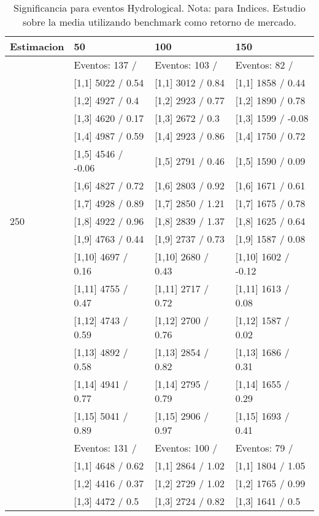 \begin{table}

\caption{Significancia para eventos Hydrological. Nota: para Indices. Estudio sobre la media utilizando benchmark como retorno de mercado.}
\centering
\begin{tabular}[t]{llll}
\toprule
Estimacion & 50 & 100 & 150\\
\midrule
 & Eventos:  137 / & Eventos:  103 / & Eventos:  82 /\\
 & {}[1,1] 5022  / 0.54 & {}[1,1] 3012  / 0.84 & {}[1,1] 1858  / 0.44\\
 & {}[1,2] 4927  / 0.4 & {}[1,2] 2923  / 0.77 & {}[1,2] 1890  / 0.78\\
 & {}[1,3] 4620  / 0.17 & {}[1,3] 2672  / 0.3 & {}[1,3] 1599  / -0.08\\
 & {}[1,4] 4987  / 0.59 & {}[1,4] 2923  / 0.86 & {}[1,4] 1750  / 0.72\\
\addlinespace
 & {}[1,5] 4546  / -0.06 & {}[1,5] 2791  / 0.46 & {}[1,5] 1590  / 0.09\\
 & {}[1,6] 4827  / 0.72 & {}[1,6] 2803  / 0.92 & {}[1,6] 1671  / 0.61\\
 & {}[1,7] 4928  / 0.89 & {}[1,7] 2850  / 1.21 & {}[1,7] 1675  / 0.78\\
250 & {}[1,8] 4922  / 0.96 & {}[1,8] 2839  / 1.37 & {}[1,8] 1625  / 0.64\\
 & {}[1,9] 4763  / 0.44 & {}[1,9] 2737  / 0.73 & {}[1,9] 1587  / 0.08\\
\addlinespace
 & {}[1,10] 4697  / 0.16 & {}[1,10] 2680  / 0.43 & {}[1,10] 1602  / -0.12\\
 & {}[1,11] 4755  / 0.47 & {}[1,11] 2717  / 0.72 & {}[1,11] 1613  / 0.08\\
 & {}[1,12] 4743  / 0.59 & {}[1,12] 2700  / 0.76 & {}[1,12] 1587  / 0.02\\
 & {}[1,13] 4892  / 0.58 & {}[1,13] 2854  / 0.82 & {}[1,13] 1686  / 0.31\\
 & {}[1,14] 4941  / 0.77 & {}[1,14] 2795  / 0.79 & {}[1,14] 1655  / 0.29\\
\addlinespace
 & {}[1,15] 5041  / 0.89 & {}[1,15] 2906  / 0.97 & {}[1,15] 1693  / 0.41\\
 & Eventos:  131 / & Eventos:  100 / & Eventos:  79 /\\
 & {}[1,1] 4648  / 0.62 & {}[1,1] 2864  / 1.02 & {}[1,1] 1804  / 1.05\\
 & {}[1,2] 4416  / 0.37 & {}[1,2] 2729  / 1.02 & {}[1,2] 1765  / 0.99\\
 & {}[1,3] 4472  / 0.5 & {}[1,3] 2724  / 0.82 & {}[1,3] 1641  / 0.5\\

\end{tabular}
\end{table}
